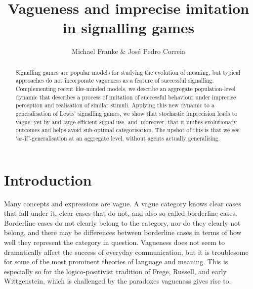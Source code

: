 \documentclass[11pt,english]{article}
\numberwithin{equation}{section}
\begin{document}
\title{{\normalsize \textbf{Vagueness and imprecise imitation in signalling games}}}
\author{{\normalsize {Michael Franke \& Jos\'e Pedro Correia}}}
\date{}

\maketitle

\thispagestyle{empty}

\begin{abstract}
  Signalling games are popular models for studying the evolution of meaning, but typical
  approaches do not incorporate vagueness as a feature of successful signalling.  Complementing
  recent like-minded models, we describe an aggregate population-level dynamic that describes a
  process of imitation of successful behaviour under imprecise perception and realisation of
  similar stimuli. Applying this new dynamic to a generalisation of Lewis' signalling games, we
  show that stochastic imprecision leads to vague, yet by-and-large efficient signal use, and,
  moreover, that it unifies evolutionary outcomes and helps avoid sub-optimal
  categorisation. The upshot of this is that we see `as-if'-generalisation at an aggregate
  level, without agents actually generalising.
\end{abstract}

\section{Introduction}
\label{sec:introduction}

Many concepts and expressions are vague. A vague category knows clear cases that fall under it,
clear cases that do not, and also so-called borderline cases. Borderline cases do not clearly
belong to the category, nor do they clearly not belong, and there may be differences between borderline cases in
terms of how well they represent the category in question. Vagueness does not seem to
dramatically affect the success of everyday communication, but it is troublesome for some of
the most prominent theories of language and meaning. This is especially so for the
logico-positivist tradition of Frege, Russell, and early Wittgenstein, which is challenged by
the paradoxes vagueness gives rise to.
\end{document}
